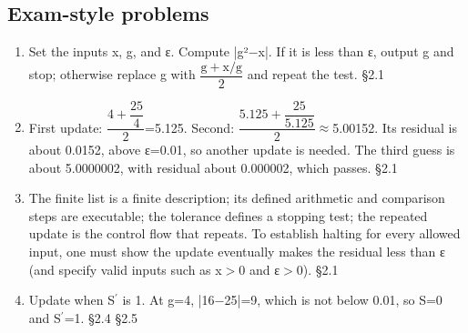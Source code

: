\documentclass[11pt]{article}
\begin{document}
\begin{keepsection}\subsection{Exam-style problems}

\begin{enumerate}
\item Set the inputs x, g, and ε. Compute |g²\ensuremath{-}x|. If it is less than ε, output g and stop; otherwise replace g with {\small\ensuremath{\dfrac{\mathrm{g}+\mathrm{x}/\mathrm{g}}{2}}} and repeat the test. \hfill{\small\color{FAUblue}§2.1}
\item First update: {\small\ensuremath{\dfrac{4+\dfrac{25}{4}}{2}}}=5.125. Second: {\small\ensuremath{\dfrac{5.125+\dfrac{25}{5.125}}{2}}}\ensuremath{\approx}5.00152. Its residual is about 0.0152, above ε=0.01, so another update is needed. The third guess is about 5.0000002, with residual about 0.000002, which passes. \hfill{\small\color{FAUblue}§2.1}
\item The finite list is a finite description; its defined arithmetic and comparison steps are executable; the tolerance defines a stopping test; the repeated update is the control flow that repeats. To establish halting for every allowed input, one must show the update eventually makes the residual less than ε (and specify valid inputs such as x\ensuremath{>}0 and ε\ensuremath{>}0). \hfill{\small\color{FAUblue}§2.1}
\item Update when S\ensuremath{{}^{\prime}} is 1. At g=4, |16\ensuremath{-}25|=9, which is not below 0.01, so S=0 and S\ensuremath{{}^{\prime}}=1. \hfill{\small\color{FAUblue}§2.4} \hfill{\small\color{FAUblue}§2.5}
\end{enumerate}

\end{keepsection}
\end{document}
